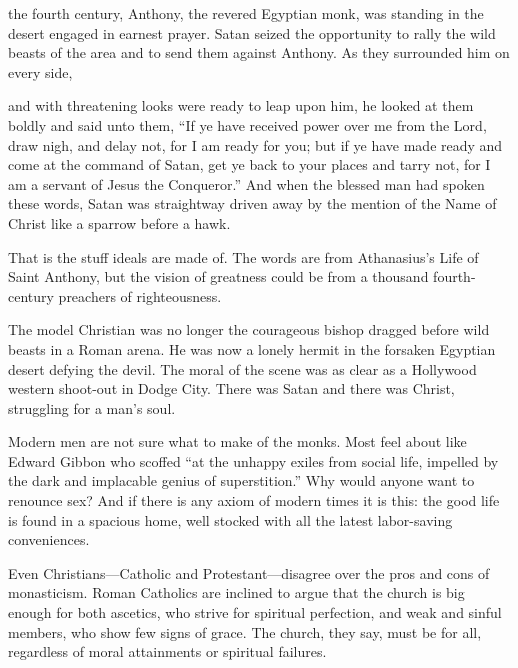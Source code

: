 
 the fourth century, Anthony, the revered Egyptian monk, was standing
in the desert engaged in earnest prayer. Satan seized the opportunity to rally the wild beasts of
the area and to send them against Anthony. As they surrounded him on every side,

\begin{blockquote}
and with threatening looks were ready to leap upon him, he looked at them boldly and said unto them,
“If ye have received power over me from the Lord, draw nigh, and delay not, for I am ready for you;
but if ye have made ready and come at the command of Satan, get ye back to your places and tarry
not, for I am a servant of Jesus the Conqueror.” And when the blessed man had spoken these words,
Satan was straightway driven away by the mention of the Name of Christ like a sparrow before a hawk.
\end{blockquote}

That is the stuff ideals are made of. The words are from Athanasius’s Life of Saint Anthony, but the
vision of greatness could be from a thousand fourth-century preachers of righteousness.

The model Christian was no longer the courageous bishop dragged before wild beasts in a Roman arena.
He was now a lonely hermit in the forsaken Egyptian desert defying the devil. The moral of the scene
was as clear as a Hollywood western shoot-out in Dodge City. There was Satan and there was Christ,
struggling for a man’s soul.

Modern men are not sure what to make of the monks. Most feel about like Edward Gibbon who scoffed
“at the unhappy exiles from social life, impelled by the dark and implacable genius of
superstition.” Why would anyone want to renounce sex? And if there is any axiom of modern times it
is this: the good life is found in a spacious home, well stocked with all the latest labor-saving
conveniences.

Even Christians—Catholic and Protestant—disagree over the pros and cons of monasticism. Roman
Catholics are inclined to argue that the church is big enough for both ascetics, who strive for
spiritual perfection, and weak and sinful members, who show few signs of grace. The church, they
say, must be for all, regardless of moral attainments or spiritual failures.

